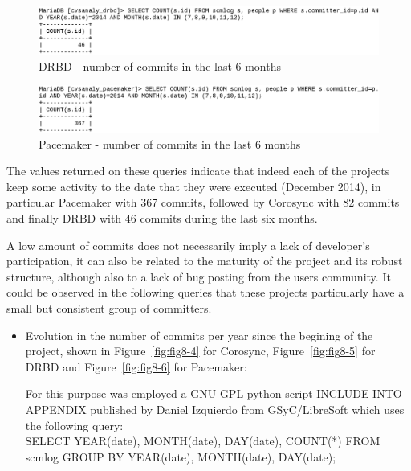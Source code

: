 \documentclass[a4paper, 12pt]{book}
\begin{document}
    \begin{figure}[H]
      \centering
      \includegraphics[scale=0.30]{fig8-2.png}
      \caption[Commits in the last 6 months for DRBD]{DRBD - number of commits in the last 6 months}
      \label{fig:fig8-2}
    \end{figure}
    
    \begin{figure}[H]
      \centering
      \includegraphics[scale=0.30]{fig8-3.png}
      \caption[Commits in the last 6 months for Pacemaker]{Pacemaker - number of commits in the last 6 months}
      \label{fig:fig8-3}
    \end{figure}


\noindent The values returned on these queries indicate that indeed each of the projects keep some activity to the date that they were executed (December 2014), in particular Pacemaker with 367 commits, followed by Corosync with 82 commits and finally DRBD with 46 commits during the last six months.\bigskip

\noindent A low amount of commits does not necessarily imply a lack of developer's participation, it can also be related to the maturity of the project and its robust structure, although also to a lack of bug posting from the users community. It could be observed in the following queries that these projects particularly have a small but consistent group of committers.


\begin{itemize}
      \item Evolution in the number of commits per year since the begining of the project, shown in Figure~\ref{fig:fig8-4} for Corosync, Figure~\ref{fig:fig8-5} for DRBD and Figure~\ref{fig:fig8-6} for Pacemaker:
      
      For this purpose was employed a GNU GPL python script {INCLUDE INTO APPENDIX} published by Daniel Izquierdo from GSyC/LibreSoft which uses the following query:\\
      SELECT YEAR(date), MONTH(date), DAY(date), COUNT(*) FROM scmlog GROUP BY YEAR(date), MONTH(date), DAY(date);
\end{itemize}
\end{document}
